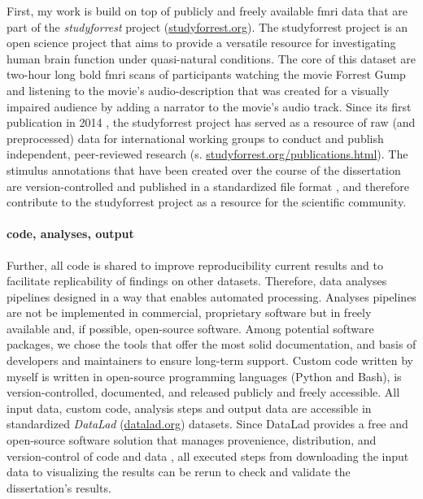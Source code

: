 First, my work is build on top of publicly and freely available \ac{fmri} data
that are part of the \textit{studyforrest} project
(\href{www.studyforrest.org}{studyforrest.org}).
%
The studyforrest project is an open science project that aims to provide a
versatile resource for investigating human brain function under quasi-natural
conditions.
%
The core of this dataset are two-hour long \ac{bold} \ac{fmri} scans of
participants watching the movie Forrest Gump \citep{ForrestGumpMovie} and
listening to the movie's audio-description that was created for a visually
impaired audience by adding a narrator to the movie's audio track.
%
Since its first publication in 2014 \citep{hanke2014audiomovie}, the
studyforrest project has served as a resource of raw (and preprocessed) data for
international working groups to conduct and publish independent, peer-reviewed
research (s.
\href{www.studyforrest.org/publications.html}{studyforrest.org/publications.html}).
%
The stimulus annotations that have been created over the course of the
dissertation are version-controlled and published in a standardized file format
\citep{haeusler2021speechanno}, and therefore contribute to the studyforrest
project as a resource for the scientific community.


\paragraph{code, analyses, output}

Further, all code is shared to improve reproducibility current results and to
facilitate replicability of findings on other datasets.
Therefore, data analyses pipelines designed in a way that enables automated
processing.
%
Analyses pipelines are not be implemented in commercial, proprietary software
but in freely available and, if possible, open-source software.
Among potential software packages, we chose the tools that offer the most solid
documentation, and basis of developers and maintainers to ensure long-term
support.
Custom code written by myself is written in open-source programming languages
(Python and Bash), is version-controlled, documented, and released publicly and
freely accessible.
%
All input data, custom code, analysis steps and output data are accessible in
standardized \textit{DataLad} (\href{www.datalad.org}{datalad.org}) datasets.
Since DataLad provides a free and open-source software solution that manages
provenience, distribution, and version-control of code and data
\citep{halchenko2021datalad}, all executed steps from downloading the input data
to visualizing the results can be rerun to check and validate the dissertation's
results.


